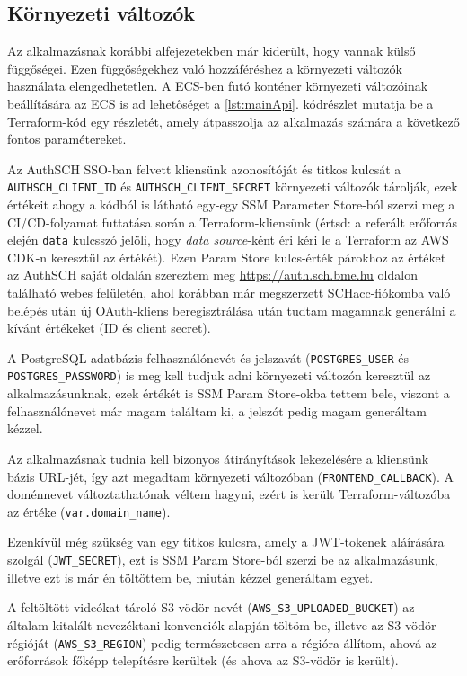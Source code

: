 \subsection{Környezeti változók}\label{sec:envvars}

Az alkalmazásnak korábbi alfejezetekben már kiderült, hogy vannak külső függőségei. Ezen függőségekhez való hozzáféréshez a környezeti változók használata elengedhetetlen. A ECS-ben futó konténer környezeti változóinak beállítására az ECS is ad lehetőséget a \ref{lst:mainApi}. kódrészlet mutatja be a Terraform-kód egy részletét, amely átpasszolja az alkalmazás számára a következő fontos paramétereket.

Az AuthSCH SSO-ban felvett kliensünk azonosítóját és titkos kulcsát a \verb|AUTHSCH_CLIENT_ID| és \verb|AUTHSCH_CLIENT_SECRET| környezeti változók tárolják, ezek értékeit ahogy a kódból is látható egy-egy SSM Parameter Store-ból szerzi meg a CI/CD-folyamat futtatása során a Terraform-kliensünk (értsd: a referált erőforrás elején \verb|data| kulcsszó jelöli, hogy \emph{data source}-ként éri kéri le a Terraform az AWS CDK-n keresztül az értékét). Ezen Param Store kulcs-érték párokhoz az értéket az AuthSCH saját oldalán szereztem meg \url{https://auth.sch.bme.hu} oldalon található webes felületén, ahol korábban már megszerzett SCHacc-fiókomba való belépés után új OAuth-kliens beregisztrálása után tudtam magamnak generálni a kívánt értékeket (ID és client secret).

A PostgreSQL-adatbázis felhasználónevét és jelszavát (\verb|POSTGRES_USER| és \verb|POSTGRES_PASSWORD|) is meg kell tudjuk adni környezeti változón keresztül az alkalmazásunknak, ezek értékét is SSM Param Store-okba tettem bele, viszont a felhasználónevet már magam találtam ki, a jelszót pedig magam generáltam kézzel.

Az alkalmazásnak tudnia kell bizonyos átirányítások lekezelésére a kliensünk bázis URL-jét, így azt megadtam környezeti változóban (\verb|FRONTEND_CALLBACK|). A doménnevet változtathatónak véltem hagyni, ezért is került Terraform-változóba az értéke (\verb|var.domain_name|).

Ezenkívül még szükség van egy titkos kulcsra, amely a JWT-tokenek aláírására szolgál (\verb|JWT_SECRET|), ezt is SSM Param Store-ból szerzi be az alkalmazásunk, illetve ezt is már én töltöttem be, miután kézzel generáltam egyet.

A feltöltött videókat tároló S3-vödör nevét (\verb|AWS_S3_UPLOADED_BUCKET|) az általam kitalált nevezéktani konvenciók alapján töltöm be, illetve az S3-vödör régióját (\verb|AWS_S3_REGION|) pedig természetesen arra a régióra állítom, ahová az erőforrások főképp telepítésre kerültek (és ahova az S3-vödör is került).

